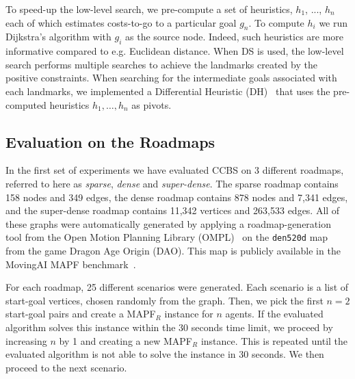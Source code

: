\documentclass[letterpaper]{article} %
\newcommand\konstantin[1]{\nb{\textbf{Konstantin:}}{red}{#1}}
\newcommand\roni[1]{\nb{\textbf{Roni:}}{orange}{#1}}
\newcommand{\ccbs}{\ac{CCBS}\xspace}
\newcommand{\mapfr}{{MAPF}$_R$\xspace}
\newcommand{\mapf}{\ac{MAPF}\xspace}
\newcommand{\ds}{\ac{DS}\xspace}
\begin{document}
To speed-up the low-level search, we pre-compute a set of heuristics, $h_1$, ..., $h_n$ each of which estimates costs-to-go to a particular goal $g_n$. To compute $h_i$ we run Dijkstra's algorithm with $g_i$ as the source node. Indeed, such heuristics are more informative compared to e.g. Euclidean distance. 
When \ds is used, the low-level search performs multiple searches to achieve the landmarks created by the positive constraints. When searching for the intermediate goals associated with each landmarks, we implemented a Differential Heuristic (DH)~\cite{goldenberg2011compressed} that uses the pre-computed heuristics $h_1,\ldots, h_n$ as pivots. %



\subsection{Evaluation on the Roadmaps}

In the first set of experiments we have evaluated \ccbs on 3 different roadmaps, referred to here as \emph{sparse}, \emph{dense} and \emph{super-dense}. The sparse roadmap contains 158 nodes and 349 edges, the dense roadmap contains 878 nodes and 7,341 edges, and the super-dense roadmap contains 11,342 vertices and 263,533 edges. All of these graphs were automatically generated by applying a roadmap-generation tool from the Open Motion Planning Library (OMPL)~\cite{sucan2012ompl} on the \texttt{den520d} map from the game Dragon Age Origin (DAO). This map is publicly available in the MovingAI \mapf benchmark~\cite{stern2019multi}. 

For each roadmap, 25 different scenarios were generated. Each scenario is a list of start-goal vertices, chosen randomly from the graph. 
Then, we pick the first $n=2$ start-goal pairs and create a \mapfr instance for $n$ agents. If the evaluated algorithm solves this instance within the 30 seconds time limit, we proceed by increasing $n$ by 1 and creating a new \mapfr instance. 
This is repeated until the evaluated algorithm is not able to solve the instance in 30 seconds. We then proceed to the next scenario. 
\end{document}
